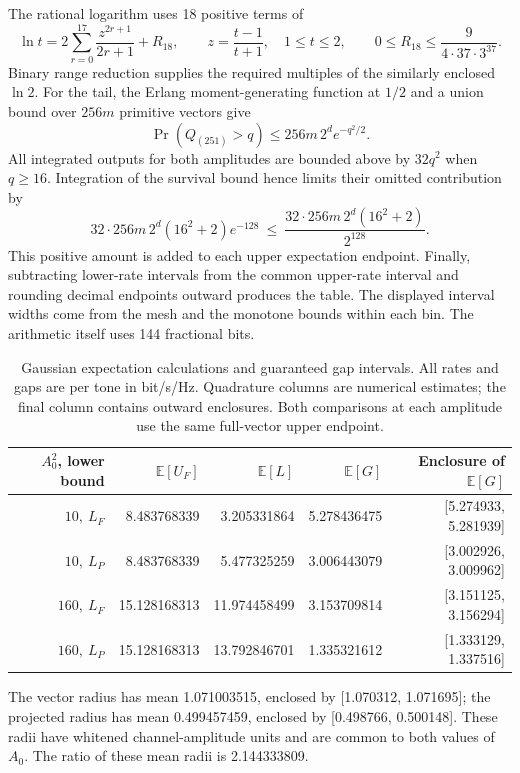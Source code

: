 The rational logarithm uses 18 positive terms of
\[
 \ln t=2\sum_{r=0}^{17}\frac{z^{2r+1}}{2r+1}+R_{18},
 \qquad z=\frac{t-1}{t+1},\quad 1\leq t\leq2,
 \qquad
 0\leq R_{18}\leq\frac{9}{4\cdot37\cdot3^{37}}.
\]
Binary range reduction supplies the required multiples of the similarly enclosed \(\ln2\). For the tail, the Erlang moment-generating function at \(1/2\) and a union bound over \(256m\) primitive vectors give
\[
 \Pr(Q_{(251)}>q)\leq256m\,2^d e^{-q^2/2}.
\]
All integrated outputs for both amplitudes are bounded above by \(32q^2\) when \(q\geq16\). Integration of the survival bound hence limits their omitted contribution by
\begin{equation}
 32\cdot256m\,2^d(16^2+2)e^{-128}
 \ \leq\ \frac{32\cdot256m\,2^d(16^2+2)}{2^{128}}.
\end{equation}
This positive amount is added to each upper expectation endpoint. Finally, subtracting lower-rate intervals from the common upper-rate interval and rounding decimal endpoints outward produces the table. The displayed interval widths come from the mesh and the monotone bounds within each bin. The arithmetic itself uses 144 fractional bits.

\begin{table}[htbp]
\centering
\small
\caption{Gaussian expectation calculations and guaranteed gap intervals. All rates and gaps are per tone in bit/s/Hz. Quadrature columns are numerical estimates; the final column contains outward enclosures. Both comparisons at each amplitude use the same full-vector upper endpoint.}
\label{supp:table1}
\begin{tabular}{rrrrr}
\hline
\(A_0^2\), lower bound & \(\mathbb E[U_F]\) & \(\mathbb E[L]\) & \(\mathbb E[G]\) & Enclosure of \(\mathbb E[G]\)\\
\hline
\(10,\ L_F\) & 8.483768339 & 3.205331864 & 5.278436475 & [5.274933, 5.281939]\\
\(10,\ L_P\) & 8.483768339 & 5.477325259 & 3.006443079 & [3.002926, 3.009962]\\
\(160,\ L_F\) & 15.128168313 & 11.974458499 & 3.153709814 & [3.151125, 3.156294]\\
\(160,\ L_P\) & 15.128168313 & 13.792846701 & 1.335321612 & [1.333129, 1.337516]\\
\hline
\end{tabular}

\smallskip
\parbox{0.98\linewidth}{\small
The vector radius has mean 1.071003515, enclosed by [1.070312, 1.071695]; the projected radius has mean 0.499457459, enclosed by [0.498766, 0.500148]. These radii have whitened channel-amplitude units and are common to both values of \(A_0\). The ratio of these mean radii is 2.144333809.}
\end{table}
